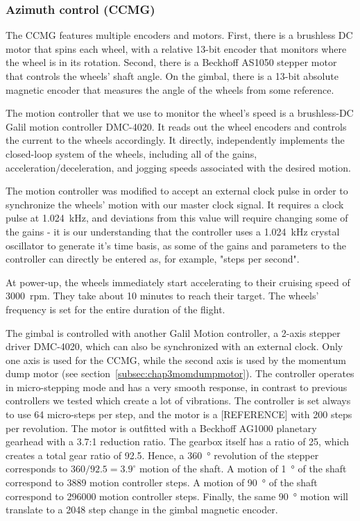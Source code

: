 \subsubsection{Azimuth control (CCMG)}

The CCMG features multiple encoders and motors. First, there is a brushless DC motor that spins each wheel, with a relative 13-bit encoder that monitors where the wheel is in its rotation. Second, there is a Beckhoff AS1050 stepper motor that controls the wheels' shaft angle. On the gimbal, there is a 13-bit  absolute magnetic encoder that measures the angle of the wheels from some reference. 

The motion controller that we use to monitor the wheel's speed is a brushless-DC Galil motion controller DMC-4020. It reads out the wheel encoders and controls the current to the wheels accordingly. It directly, independently implements the closed-loop system of the wheels, including all of the gains, acceleration/deceleration, and jogging speeds associated with the desired motion.

The motion controller was modified to accept an external clock pulse in order to synchronize the wheels' motion with our master clock signal. It requires a clock pulse at \SI{1.024}{\kilo\hertz}, and deviations from this value will require changing some of the gains - it is our understanding that the controller uses a \SI{1.024}{\kilo\hertz} crystal oscillator to generate it's time basis, as some of the gains and parameters to the controller can directly be entered as, for example, "steps per second". 

At power-up, the wheels immediately start accelerating to their cruising speed of \num{3000}~rpm. They take about 10 minutes to reach their target. The wheels' frequency is set for the entire duration of the flight.

The gimbal is controlled with another Galil Motion controller, a 2-axis stepper driver DMC-4020, which can also be synchronized with an external clock. Only one axis is used for the CCMG, while the second axis is used by the momentum dump motor (see section~\ref{subsec:chap3momdumpmotor}). The controller operates in micro-stepping mode and has a very smooth response, in contrast to previous controllers we tested which create a lot of vibrations. The controller is set always to use 64 micro-steps per step, and the motor is a [REFERENCE] with 200 steps per revolution. The motor is outfitted with a Beckhoff AG1000 planetary gearhead with a 3.7:1 reduction ratio. The gearbox itself has a ratio of 25, which creates a total gear ratio of 92.5. Hence, a \SI{360}{\degree} revolution of the stepper corresponds to $360/92.5=3.9^\circ$ motion of the shaft. A motion of \SI{1}{\degree} of the shaft correspond to \num{3889} motion controller steps. A motion of \SI{90}{\degree} of the shaft correspond to \num{296000} motion controller steps. Finally, the same \SI{90}{\degree} motion will translate to a \num{2048} step change in the gimbal magnetic encoder.

